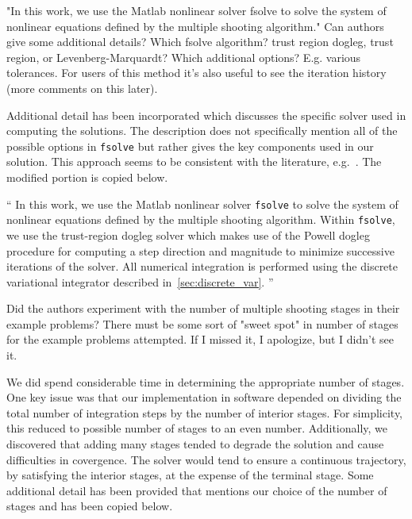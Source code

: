 \documentclass[11pt]{article}
\newenvironment{correction}{\begin{list}{}{\setlength{\leftmargin}{1cm}\setlength{\rightmargin}{1cm}}\vspace{\parsep}\item[]``}{''\end{list}}
\begin{document}
\begin{enumerate}
\item
    \begin{itshape}
"In this work, we use the Matlab nonlinear solver fsolve to solve the system of nonlinear equations defined by the multiple shooting algorithm."  Can authors give some additional details?  Which fsolve algorithm? trust region dogleg,  trust region, or Levenberg-Marquardt?  Which additional options?  E.g. various tolerances.  For users of this method it's also useful to see the iteration history (more comments on this later).
\end{itshape}

Additional detail has been incorporated which discusses the specific solver used in computing the solutions. 
The description does not specifically mention all of the possible options in \texttt{fsolve} but rather gives the key components used in our solution.
This approach seems to be consistent with the literature, e.g.~\cite{ozimek2010a,stuart2010}.
The modified portion is copied below.

\begin{correction}
In this work, we use the Matlab nonlinear solver \texttt{fsolve} to solve the system of nonlinear equations defined by the multiple shooting algorithm.
Within \texttt{fsolve}, we use the trust-region dogleg solver which makes use of the Powell dogleg procedure for computing a step direction and magnitude to minimize successive iterations of the solver.
All numerical integration is performed using the discrete variational integrator described in~\cref{sec:discrete_var}.
\end{correction}

\item
    \begin{itshape}
Did the authors experiment with the number of multiple shooting stages in their example problems?  There must be some sort of "sweet spot" in number of stages for the example problems attempted.  If I missed it, I apologize, but I didn't see it.
\end{itshape}

We did spend considerable time in determining the appropriate number of stages. 
One key issue was that our implementation in software depended on dividing the total number of integration steps by the number of interior stages.
For simplicity, this reduced to possible number of stages to an even number. 
Additionally, we discovered that adding many stages tended to degrade the solution and cause difficulties in covergence. 
The solver would tend to ensure a continuous trajectory, by satisfying the interior stages, at the expense of the terminal stage. 
Some additional detail has been provided that mentions our choice of the number of stages and has been copied below.


\end{enumerate}
\end{document}
